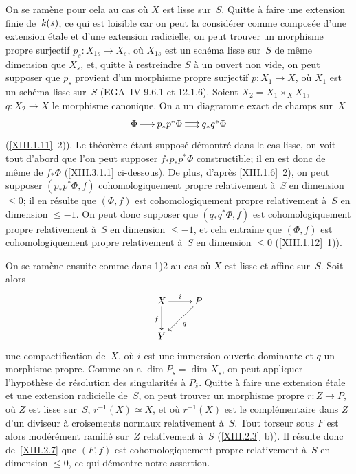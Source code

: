 On se ram\`ene pour cela au cas o\`u $X$ est lisse sur~$S$. Quitte
\`a faire une extension finie de~$\mathit{k}(s)$, ce qui est loisible car on
peut la consid\'erer comme compos\'ee d'une extension \'etale et
d'une extension radicielle, on peut trouver un morphisme propre
surjectif $p_s \colon X_{1s}\to X_s$, o\`u $X_{1s}$ est un
sch\'ema lisse sur~$S$ de m\^eme dimension que $X_s$, et, quitte
\`a restreindre $S$ \`a un ouvert non vide, on peut supposer que
$p_s$ provient d'un morphisme propre surjectif $p \colon X_1 \to X$,
o\`u $X_1$ est un sch\'ema lisse sur~$S$
(EGA~IV 9.6.1 et 12.1.6). Soient $X_2=X_1 \times_X X_1$, $q \colon
X_2 \to X$ le morphisme canonique. On a un diagramme exact de champs
sur~$X$
$$
\xymatrix@C=.5cm{{\Phi}\ar[r]&{p_*p^* \Phi}\ar@<2pt>[r]\ar@<-2pt>[r]&{q_*q^*\Phi}}
$$
(\ref{XIII.1.11}~2)). Le th\'eor\`eme \'etant suppos\'e
d\'emontr\'e dans le cas lisse, on voit tout d'abord que l'on peut
supposer $f_*p_*p^*\Phi$ constructible; il en est donc de m\^eme de
$f_*\Phi$ (\ref{XIII.3.1.1} ci-dessous). De plus, d'apr\`es \ref{XIII.1.6}~2),
on peut supposer $(p_*p^*\Phi,f)$ cohomologiquement propre
relativement \`a~$S$ en dimension $\le 0$; il en r\'esulte que
$(\Phi,f)$ est cohomologiquement propre relativement \`a~$S$ en
dimension $\le -1$. On peut donc supposer que $(q_*q^*\Phi,f)$ est
cohomologiquement propre relativement \`a~$S$ en dimension $\le -1$,
et cela entra\^ine que $(\Phi,f)$ est cohomologiquement propre
relativement \`a~$S$ en dimension $\le 0$ (\ref{XIII.1.12}~1)).

On se ram\`ene ensuite comme dans 1)2 au cas o\`u $X$ est lisse
et affine sur~$S$. Soit alors
$$
\xymatrix{{X}\ar[r]^{i}\ar[d]_{f}&{P}\ar[ld]^{q}\\{Y}}
$$
une compactification de~$X$, o\`u $i$ est une immersion ouverte
dominante et $q$ un morphisme propre. Comme on a $\dim P_s=\dim X_s$,
on peut appliquer l'hypoth\`ese de r\'esolution des
singularit\'es \`a $P_{\overline s}$. Quitte \`a faire une
extension \'etale et une extension radicielle de~$S$, on peut
trouver un morphisme propre $r \colon Z \to P$, o\`u $Z$ est lisse
sur~$S$, $r^{-1}(X)\simeq X$, et o\`u $r^{-1}(X)$ est le
compl\'ementaire dans $Z$ d'un diviseur \`a croisements normaux
relativement \`a~$S$. Tout torseur sous $F$ est alors
mod\'er\'ement ramifi\'e sur~$Z$ relativement \`a~$S$
(\ref{XIII.2.3}~b)). Il r\'esulte donc de~\ref{XIII.2.7} que $(F,f)$
est cohomologiquement propre relativement \`a~$S$ en dimension $\le
0$, ce qui d\'emontre notre assertion.

